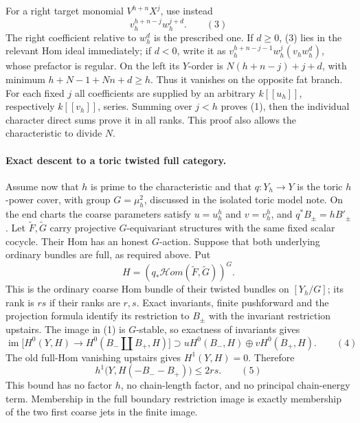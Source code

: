 For a right target monomial $V^{h+n}X^j$, use instead
\[
                       v_h^{h+n-j}w_h^{j+d}.           \qquad(3)
\]
The right coefficient relative to $w_h^d$ is the prescribed one.
If $d\ge0$, (3) lies in the relevant Hom ideal immediately; if $d<0$,
write it as $v_h^{h+n-j-1}w_h^j(v_hw_h^d)$, whose prefactor is regular.
On the left its $Y$-order is $N(h+n-j)+j+d$, with minimum
$h+N-1+Nn+d\ge h$. Thus it vanishes on the opposite fat branch.
For each fixed $j$ all coefficients are supplied by an arbitrary
$k[[u_h]]$, respectively $k[[v_h]]$, series. Summing over $j<h$ proves
(1), then the individual character direct sums prove it in all ranks.
This proof also allows the characteristic to divide $N$.

\paragraph{Exact descent to a toric twisted full category.}
Assume now that $h$ is prime to the characteristic and that
$q:Y_h\to Y$ is the toric $h$-power cover, with group
$G=\mu_h^2$, discussed in the isolated toric model note. On the end
charts the coarse parameters satisfy $u=u_h^h$ and $v=v_h^h$, and
$q^*B_\pm=hB'_\pm$. Let $\widetilde F,\widetilde G$ carry projective
$G$-equivariant structures with the same fixed scalar cocycle. Their Hom
has an honest $G$-action. Suppose that both underlying ordinary bundles
are full, as required above. Put
\[
             H=(q_*\mathcal Hom(\widetilde F,\widetilde G))^G.
\]
This is the ordinary coarse Hom bundle of their twisted bundles on
$[Y_h/G]$; its rank is $rs$ if their ranks are $r,s$.
Exact invariants, finite pushforward and the projection formula identify
its restriction to $B_\pm$ with the invariant restriction upstairs.
The image in (1) is $G$-stable, so exactness of invariants gives
\[
 \operatorname{im}\bigl[H^0(Y,H)\to H^0(B_-\amalg B_+,H)\bigr]
             \supset u H^0(B_-,H)\oplus v H^0(B_+,H).    \qquad(4)
\]
The old full-Hom vanishing upstairs gives $H^1(Y,H)=0$. Therefore
\[
       h^1\bigl(Y,H(-B_--B_+)\bigr)\le 2rs.             \qquad(5)
\]
This bound has no factor $h$, no chain-length factor, and no principal
chain-energy term. Membership in the full boundary restriction image is
exactly membership of the two first coarse jets in the finite image.

